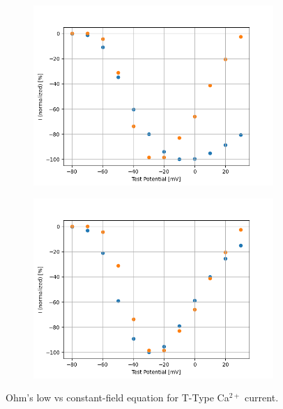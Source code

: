 \documentclass[../main.tex]{subfiles}
\begin{document}
\begin{figure}[!t]
    \begin{subfigure}[t]{0.45\textwidth}
        \centering
        \includegraphics[width=\textwidth]{../../reports/workflow/img/t_type_calcium_channel/simulations/No Scale/Ohm's LawVoltage Step5_IV_Relationship_comparison_Jeong_2015.png}
        \caption{}
        \label{fig_t_type_ohmic_iv_relationship}
    \end{subfigure}
    \hfill
    \begin{subfigure}[t]{0.45\textwidth}
        \centering
        \includegraphics[width=\textwidth]{../../reports/workflow/img/t_type_calcium_channel/simulations/No Scale/Constant Field EquationVoltage Step5_IV_Relationship_comparison_Jeong_2015.png}
        \caption{}
        \label{fig_t_type_constant_field_iv_relationship}
    \end{subfigure}
    
    \caption{Ohm's low vs constant-field equation for T-Type Ca$^{2+}$ current.}
    \label{fig_t_type_voltage_step_ohmic_vs_constant_field}
\end{figure}
\end{document}
